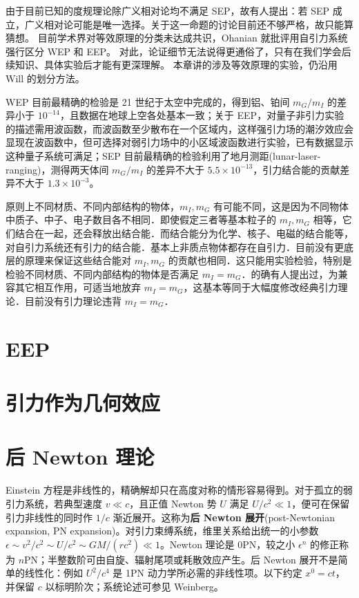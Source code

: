 由于目前已知的度规理论除广义相对论均不满足 SEP，故有人提出：若 SEP 成立，广义相对论可能是唯一选择。关于这一命题的讨论目前还不够严格，故只能算猜想。
目前学术界对等效原理的分类未达成共识，Ohanian\cite{Ohanian} 就批评用自引力系统强行区分 WEP 和 EEP。
对此，论证细节无法说得更通俗了，只有在我们学会后续知识、具体实验后才能有更深理解。
本章讲的涉及等效原理的实验，仍沿用 Will 的划分方法。

WEP 目前最精确的检验是 21 世纪于太空中完成的，得到铝、铂间 $m_G/m_I$ 的差异小于 $10^{-14}$，且数据在地球上空各处基本一致；关于 EEP，对量子非引力实验的描述需用波函数，而波函数至少散布在一个区域内，这样强引力场的潮汐效应会显现在波函数中，但可选择对弱引力场中的小区域波函数进行实验，已有数据显示这种量子系统可满足；SEP 目前最精确的检验利用了地月测距(lunar-laser-ranging)，测得两天体间 $m_G/m_I$ 的差异不大于 $5.5\times 10^{-13}$，引力结合能的贡献差异不大于 $1.3\times 10^{-3}$。

原则上不同材质、不同内部结构的物体，$m_I,m_G$ 有可能不同，这是因为不同物体中质子、中子、电子数目各不相同．即使假定三者等基本粒子的 $m_I,m_G$ 相等，它们结合在一起，还会释放出结合能．而结合能分为化学、核子、电磁的结合能等，对自引力系统还有引力的结合能．基本上非质点物体都存在自引力．目前没有更底层的原理来保证这些结合能对 $m_I,m_G$ 的贡献也相同．这只能用实验检验，特别是检验不同材质、不同内部结构的物体是否满足 $m_I=m_G$．的确有人提出过，为兼容其它相互作用，可适当地放弃 $m_I=m_G$，这基本等同于大幅度修改经典引力理论．目前没有引力理论违背 $m_I=m_G$．

\section{EEP}

\section{引力作为几何效应}

\section{后 Newton 理论}

Einstein 方程是非线性的，精确解却只在高度对称的情形容易得到。对于孤立的弱引力系统，若典型速度 $v\ll c$，且正值 Newton 势 $U$ 满足 $U/c^2\ll1$，便可在保留引力非线性的同时作 $1/c$ 渐近展开。这称为\textbf{后 Newton 展开}(post-Newtonian expansion, PN expansion)。对引力束缚系统，维里关系给出统一的小参数 $\epsilon\sim v^2/c^2\sim U/c^2\sim GM/(rc^2)\ll1$。Newton 理论是 0PN，较之小 $\epsilon^n$ 的修正称为 $n$PN；半整数阶可由自旋、辐射尾项或耗散效应产生。后 Newton 展开不是简单的线性化：例如 $U^2/c^4$ 是 1PN 动力学所必需的非线性项。以下约定 $x^0=ct$，并保留 $c$ 以标明阶次；系统论述可参见 Weinberg\cite{Weinberg}。

